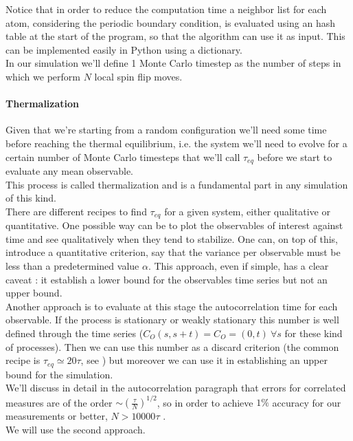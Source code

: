 Notice that in order to reduce the computation time a neighbor list for each atom, considering the periodic boundary condition, 
is evaluated using an hash table at the start of the program, so that the algorithm can use it as input. This can be implemented
 easily in Python using a dictionary. \\
In our simulation we'll define 1 Monte Carlo timestep as the number of steps in which we perform $N$ local spin flip moves. \\

\paragraph{Thermalization} Given that we're starting from a random configuration we'll need some time before reaching the thermal equilibrium, 
i.e. the system we'll need to evolve for a certain number of Monte Carlo timesteps that we'll call $\tau_{eq}$ before we start to evaluate any mean observable. \\
This process is called thermalization and is a fundamental part in any simulation of this kind. \\
There are different recipes to find $\tau_{eq}$ for a given system, either qualitative or quantitative. One possible way can be to plot the
observables of interest against time and see qualitatively when they tend to stabilize. One can, on top of this, introduce a quantitative criterion,
say that the variance per observable must be less than a predetermined value $\alpha$. This approach, even if simple, has a clear caveat : it establish a lower
bound for the observables time series but not an upper bound. \\
Another approach is to evaluate at this stage the autocorrelation time for each observable. If the process is stationary or weakly stationary this number is 
well defined through the time series ($C_O(s, s+t) = C_O=(0, t)\ \forall s$ for these kind of processes). Then we can use this number as a discard criterion 
(the common recipe is $\tau_{eq} \simeq 20 \tau$, see \cite{Sokal1997}) but moreover we can use it in establishing an upper bound for the simulation. \\
We'll discuss in detail in the autocorrelation paragraph that errors for correlated measures are of the order $\sim (\frac{\tau}{N})^{1/2}$, so in order to 
achieve $1 \%$ accuracy for our measurements or better, $N > 10000\tau$ . \\
We will use the second approach. \\

